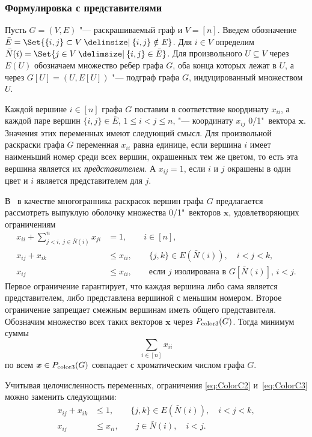 \subsubsection{Формулировка с представителями}

Пусть $G=(V,E)$ "--- раскрашиваемый граф и $V=[n]$. 
Введем обозначение $\bar{E} = \Set{\{i,j\} \subset V \given \{i,j\}\notin E}$.
Для $i\in V$ определим $\bar{N}(i) = \Set{j\in V \given \{i,j\}\in \bar{E}}$.
Для произвольного $U \subseteq V$ через $E(U)$ обозначаем множество ребер графа $G$, оба конца которых лежат в $U$, а через $G[U] = (U, E[U])$ "--- подграф графа $G$, индуцированный множеством $U$.

Каждой вершине $i\in[n]$ графа $G$ поставим в соответствие координату $x_{ii}$, а каждой паре вершин $\{i,j\} \in \bar{E}$, $1 \le i < j \le n$, "--- координату $x_{ij}$ 0/1"~вектора $\bm{x}$.
Значения этих переменных имеют следующий смысл.
Для произвольной раскраски графа $G$ переменная $x_{ii}$ равна единице, если вершина $i$ имеет наименьший номер среди всех вершин, окрашенных тем же цветом,
то есть эта вершина является их \emph{представителем}.
А $x_{ij}=1$, если $i$ и $j$ окрашены в один цвет и $i$ является представителем для $j$.

В~\cite{Campelo:2008} в качестве многогранника раскрасок вершин графа $G$ предлагается рассмотреть выпуклую оболочку множества 0/1"~векторов $\bm{x}$, удовлетворяющих ограничениям
\begin{align}
x_{ii} + \sum_{j<i, \ j\in\bar{N}(i)}^n x_{ji} &= 1, \qquad i\in[n], \label{eq:ColorC1}\\
x_{ij} + x_{ik} &\le x_{ii}, \qquad \{j,k\} \in E(\bar{N}(i)), \quad i < j < k, \label{eq:ColorC2}\\
x_{ij} &\le x_{ii}, \qquad \text{если $j$ изолирована в $G[\bar{N}(i)]$, $i<j$.}\label{eq:ColorC3}
\end{align}
Первое ограничение гарантирует, что каждая вершина либо сама является представителем, либо представлена вершиной с меньшим номером.
Второе ограничение запрещает смежным вершинам иметь общего представителя.
Обозначим множество всех таких векторов $\bm{x}$ через $P_{\textup{color3}}(G)$.
Тогда минимум суммы
\begin{equation}
\label{eq:ColorC4}
\sum_{i\in[n]} x_{ii}
\end{equation}
по всем $\bm{x} \in P_{\textup{color3}}(G)$ совпадает с хроматическим числом графа $G$.

Учитывая целочисленность переменных, ограничения \eqref{eq:ColorC2} и~\eqref{eq:ColorC3} можно заменить следующими:
\begin{align}
x_{ij} + x_{ik} &\le 1, \qquad \{j,k\} \in E(\bar{N}(i)), \quad i < j < k, \label{eq:ColorC5}\\ 
x_{ij} &\le x_{ii}, \qquad j \in \bar{N}(i), \quad i<j. \label{eq:ColorC6}
\end{align}

